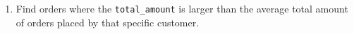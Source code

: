 \documentclass[12pt,a4paper]{article}
\begin{document}
\begin{enumerate}



    \item Find orders where the \texttt{total\_amount} is larger than the average total amount of orders placed by that specific customer.

\end{enumerate}
\end{document}
